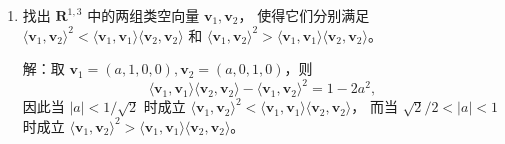 \begin{enumerate}
（1）由 Schwarz 不等式，$|\boldsymbol{r}_{1} \cdot \boldsymbol{r}_{2}|<c^{2}t_{1}t_{2}$，
从而 $\langle\boldsymbol{v}_{1}, \boldsymbol{v}_{2}\rangle>0$。

（2）$\langle\boldsymbol{v}_{1}+\boldsymbol{v}_{2}, \boldsymbol{v}_{1}+\boldsymbol{v}_{2}\rangle
=\langle\boldsymbol{v}_{1}, \boldsymbol{v}_{1}\rangle+\langle\boldsymbol{v}_{2}, \boldsymbol{v}_{2}\rangle
+2\langle\boldsymbol{v}_{1}, \boldsymbol{v}_{2}\rangle>0$。
又由 $t_{1}+t_{2}>0$ 得 $\boldsymbol{v}_{1}+\boldsymbol{v}_{2}$ 是指向未来的类时向量。

（3）记 $\theta$ 为 $\boldsymbol{r}_{1}$ 与 $\boldsymbol{r}_{2}$ 之间的夹角。
\begin{align*}
& \quad (c^{2}t_{1}t_{2}-\boldsymbol{r}_{1}\cdot\boldsymbol{r}_{2})^{2}-(c^{2}t_{1}^{2}-r_{1}^{2})(c^{2}t_{2}^{2}-r_{2}^{2}) \\
& = -2c^{2}t_{1}t_{2} \boldsymbol{r}_{1}\cdot\boldsymbol{r}_{2}+c^{2}t_{2}^{2}r_{1}^{2}+c^{2}t_{1}^{2}r_{2}^{2}-r_{1}^{2}r_{2}^{2}+(\boldsymbol{r}_{1}\cdot\boldsymbol{r}_{2})^{2} \\
& = -2c^{2}t_{1}t_{2}r_{1}r_{2}\cos\theta+c^{2}t_{2}^{2}r_{1}^{2}+c^{2}t_{1}^{2}r_{2}^{2}-r_{1}^{2}r_{2}^{2}+r_{1}^{2}r_{2}^{2}\cos^{2}\theta \\
& = (ct_{1}r_{2}-ct_{2}r_{1}\cos\theta)^{2}+r_{1}^{2}(c^{2}t_{2}^{2}-r_{2}^{2})\sin^{2}\theta \geqslant 0.
\end{align*}

（4）由（3）即得。
    
    \item 找出 $\mathbf{R}^{1,3}$ 中的两组类空向量 $\boldsymbol{v}_1, \boldsymbol{v}_2$，
    使得它们分别满足 $\langle\boldsymbol{v}_1, \boldsymbol{v}_2\rangle^2
    <\langle\boldsymbol{v}_1, \boldsymbol{v}_1\rangle
    \langle\boldsymbol{v}_2, \boldsymbol{v}_2\rangle$ 
    和 $\langle\boldsymbol{v}_1, \boldsymbol{v}_2\rangle^2
    >\langle\boldsymbol{v}_1, \boldsymbol{v}_1\rangle
    \langle\boldsymbol{v}_2, \boldsymbol{v}_2\rangle$。

解：取 $\boldsymbol{v}_{1}=(a,1,0,0), \boldsymbol{v}_{2}=(a,0,1,0)$，则
$$\langle\boldsymbol{v}_{1}, \boldsymbol{v}_{1}\rangle\langle\boldsymbol{v}_{2}, \boldsymbol{v}_{2}\rangle
-\langle\boldsymbol{v}_{1}, \boldsymbol{v}_{2}\rangle^{2}=1-2a^{2},$$
因此当 $|a|<1/\sqrt{2}$ 时成立 $\langle\boldsymbol{v}_{1}, \boldsymbol{v}_{2}\rangle^{2}<\langle\boldsymbol{v}_{1}, \boldsymbol{v}_{1}\rangle\langle\boldsymbol{v}_{2}, \boldsymbol{v}_{2}\rangle$，
而当 $\sqrt{2}/2<|a|<1$ 时成立 $\langle\boldsymbol{v}_{1}, \boldsymbol{v}_{2}\rangle^{2}>\langle\boldsymbol{v}_{1}, \boldsymbol{v}_{1}\rangle\langle\boldsymbol{v}_{2}, \boldsymbol{v}_{2}\rangle$。
    

\end{enumerate}

